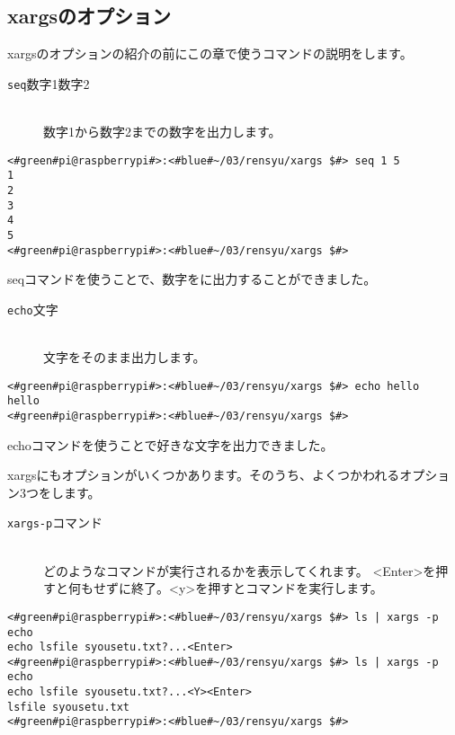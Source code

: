 \subsection{xargsのオプション}
xargsのオプションの紹介の前にこの章で使うコマンドの説明をします。
\begin{description}
\item[\texttt{seq}\textvisiblespace 数字1\textvisiblespace 数字2]\mbox{}\\
数字1から数字2までの数字を出力します。
\end{description}

\begin{lstlisting}[caption=seqコマンド]
<#green#pi@raspberrypi#>:<#blue#~/03/rensyu/xargs $#> seq 1 5
1
2
3
4
5
<#green#pi@raspberrypi#>:<#blue#~/03/rensyu/xargs $#>
\end{lstlisting}
seqコマンドを使うことで、数字をに出力することができました。

\begin{description}
\item[\texttt{echo}\textvisiblespace 文字]\mbox{}\\
文字をそのまま出力します。
\end{description}

\begin{lstlisting}[caption=seqコマンド]
<#green#pi@raspberrypi#>:<#blue#~/03/rensyu/xargs $#> echo hello
hello
<#green#pi@raspberrypi#>:<#blue#~/03/rensyu/xargs $#>
\end{lstlisting}
echoコマンドを使うことで好きな文字を出力できました。

xargsにもオプションがいくつかあります。そのうち、よくつかわれるオプション3つをします。

\begin{description}
\item[\texttt{xargs}\textvisiblespace \texttt{-p}\textvisiblespace コマンド]\mbox{}\\
どのようなコマンドが実行されるかを表示してくれます。
<Enter>を押すと何もせずに終了。<y>を押すとコマンドを実行します。
\end{description}

\begin{lstlisting}[caption=xargsコマンドのオプションp]
<#green#pi@raspberrypi#>:<#blue#~/03/rensyu/xargs $#> ls | xargs -p echo
echo lsfile syousetu.txt?...<Enter>
<#green#pi@raspberrypi#>:<#blue#~/03/rensyu/xargs $#> ls | xargs -p echo
echo lsfile syousetu.txt?...<Y><Enter>
lsfile syousetu.txt
<#green#pi@raspberrypi#>:<#blue#~/03/rensyu/xargs $#>
\end{lstlisting}

